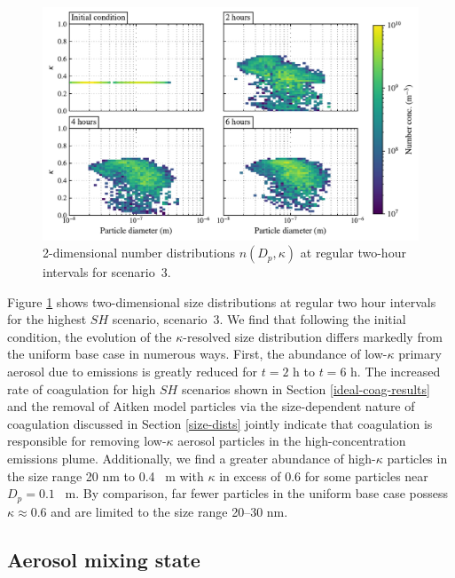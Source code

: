 \begin{figure}[!t]
  \centering
    \includegraphics[width=\textwidth]{figures/chapter5/2d-kappa-dist-4-panel-point-source-1x1-z40.pdf}
    \caption{2-dimensional number distributions $n(D_p, \kappa)$ at regular two-hour intervals for scenario~3.}
    \label{fig:2d-kappa-dist-s3}
\end{figure}

Figure \ref{fig:2d-kappa-dist-s3} shows two-dimensional size distributions at regular two hour intervals for the highest $SH$ scenario, scenario~3. We find that following the initial condition, the evolution of the $\kappa$-resolved size distribution differs markedly from the uniform base case in numerous ways. First, the abundance of low-$\kappa$ primary aerosol due to emissions is greatly reduced for $t=2$ h to $t=6$ h. The increased rate of coagulation for high $SH$ scenarios shown in Section \ref{ideal-coag-results} and the removal of Aitken model particles via the size-dependent nature of coagulation discussed in Section \ref{size-dists} jointly indicate that coagulation is responsible for removing  low-$\kappa$ aerosol particles in the high-concentration emissions plume. Additionally, we find a greater abundance of high-$\kappa$ particles in the size range 20 nm to 0.4 \si{\mu m} with $\kappa$ in excess of 0.6 for some particles near $D_p=0.1$ \si{\mu m}. By comparison, far fewer particles in the uniform base case possess $\kappa\approx0.6$ and are limited to the size range 20--30 nm. 

\subsection{Aerosol mixing state}

